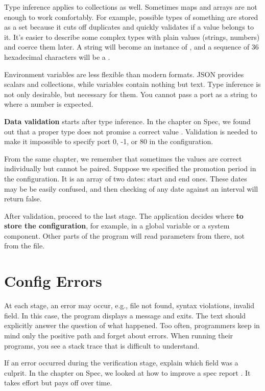 Type inference applies to collections as well. Sometimes maps and arrays are not enough to work comfortably. For example, possible types of something are stored as a set because it cuts off duplicates and quickly validates if a value belongs to it. It's easier to describe some complex types with plain values (strings, numbers) and coerce them later. A string  will become an instance of , and a sequence of 36 hexadecimal characters will be a .

Environment variables are less flexible than modern formats. JSON provides scalars and collections, while variables contain nothing but text. Type inference is not only desirable, but necessary for them. You cannot pass a port as a string to where a number is expected.


\textbf{Data validation} starts after type inference. In the chapter on Spec, we found out that a proper type does not promise a correct value . Validation is needed to make it impossible to specify port 0, -1, or 80 in the configuration.

From the same chapter, we remember that sometimes the values are correct individually but cannot be paired. Suppose we specified the promotion period in the configuration. It is an array of two dates: start and end ones. These dates may be be easily confused, and then checking of any date against an interval will return false.

After validation, proceed to the last stage. The application decides where \textbf{to store the configuration}, for example, in a global variable or a system component. Other parts of the program will read parameters from there, not from the file.

\section{Config Errors}


At each stage, an error may occur, e.g., file not found, syntax violations, invalid field. In this case, the program displays a message and exits. The text should explicitly answer the question of what happened. Too often, programmers keep in mind only the positive path and forget about errors. When running their programs, you see a stack trace that is difficult to understand.

If an error occurred during the verification stage, explain which field was a culprit. In the chapter on Spec, we looked at how to improve a spec report . It takes effort but pays off over time.

